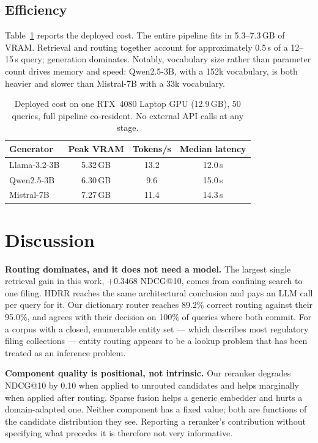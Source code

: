 \documentclass[conference]{IEEEtran}
\begin{document}
\subsection{Efficiency}
Table~\ref{tab:efficiency} reports the deployed cost. The entire pipeline fits
in 5.3--7.3\,GB of VRAM. Retrieval and routing together account for
approximately 0.5\,s of a 12--15\,s query; generation dominates. Notably,
vocabulary size rather than parameter count drives memory and speed:
Qwen2.5-3B, with a 152k vocabulary, is both heavier and slower than Mistral-7B
with a 33k vocabulary.

\begin{table}[t]
\caption{Deployed cost on one RTX~4080 Laptop GPU (12.9\,GB), 50 queries, full
pipeline co-resident. No external API calls at any stage.}
\label{tab:efficiency}
\centering
\small
\begin{tabular}{lccc}
\toprule
Generator & Peak VRAM & Tokens/s & Median latency \\
\midrule
Llama-3.2-3B & 5.32\,GB & 13.2 & 12.0\,s \\
Qwen2.5-3B & 6.30\,GB & 9.6 & 15.0\,s \\
Mistral-7B & 7.27\,GB & 11.4 & 14.3\,s \\
\bottomrule
\end{tabular}
\end{table}

\section{Discussion}
\label{sec:disc}

\textbf{Routing dominates, and it does not need a model.} The largest single
retrieval gain in this work, $+0.3468$ NDCG@10, comes from confining search to
one filing. HDRR reaches the same architectural conclusion and pays an LLM call
per query for it. Our dictionary router reaches 89.2\% correct routing against
their 95.0\%, and agrees with their decision on 100\% of queries where both
commit. For a corpus with a closed, enumerable entity set --- which describes
most regulatory filing collections --- entity routing appears to be a lookup
problem that has been treated as an inference problem.

\textbf{Component quality is positional, not intrinsic.} Our reranker degrades
NDCG@10 by 0.10 when applied to unrouted candidates and helps marginally when
applied after routing. Sparse fusion helps a generic embedder and hurts a
domain-adapted one. Neither component has a fixed value; both are functions of
the candidate distribution they see. Reporting a reranker's contribution
without specifying what precedes it is therefore not very informative.
\end{document}
